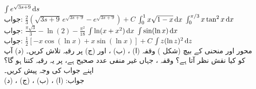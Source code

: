 $\int e^{\sqrt{3s+9}}\dif s$\\
جواب:\quad
$\tfrac{2}{3}(\sqrt{3s+9}\,e^{\sqrt{3s+9}}-e^{\sqrt{3s+9}})+C$
$\int_0^1x\sqrt{1-x}\dif x$
$\int_0^{\pi/3}x\tan^2x\dif x$\\
جواب:\quad
$\tfrac{\pi\sqrt{3}}{3}-\ln(2)-\tfrac{\pi^2}{18}$
$\int \ln(x+x^2)\dif x$
$\int \sin(\ln x)\dif x$\\
جواب:\quad
$\tfrac{1}{2}[-x\cos(\ln x)+x\sin(\ln x)]+C$
$\int z(\ln z)^2\dif z$
\\
محور  اور منحنی  کے بیچ (شکل ) وقفہ (ا) ، (ب) ، اور (ج)  پر رقبہ تلاش کریں۔ (د) آپ کو کیا نقش نظر آتا ہے؟ وقفہ ، جہاں  غیر منفی عدد صحیح ہے، پر یہ رقبہ کتنا ہو گا؟ اپنے جواب کی وجہ پیش کریں۔\\
جواب:\quad
(ا) ، (ب) ، (ج) ، (د) 
